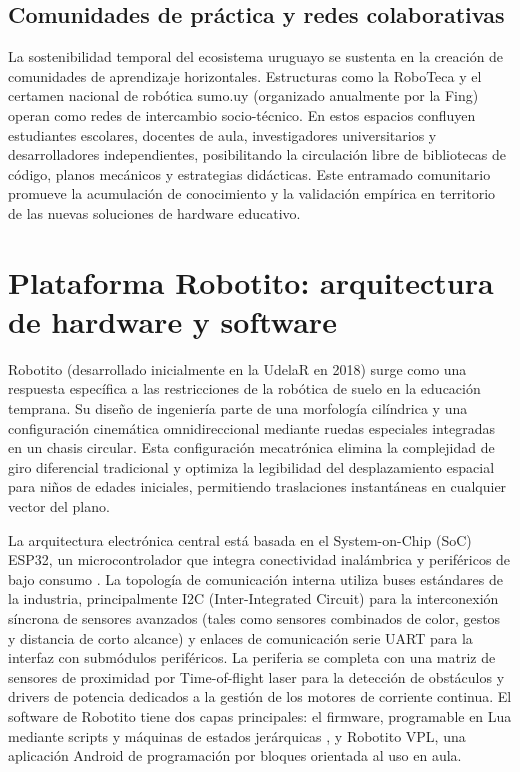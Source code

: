\documentclass{prgrado}
\begin{document}
\subsection{Comunidades de práctica y redes colaborativas}

La sostenibilidad temporal del ecosistema uruguayo se sustenta en la creación de comunidades de aprendizaje horizontales. Estructuras como la RoboTeca y el certamen nacional de robótica sumo.uy (organizado anualmente por la Fing) operan como redes de intercambio socio-técnico. En estos espacios confluyen estudiantes escolares, docentes de aula, investigadores universitarios y desarrolladores independientes, posibilitando la circulación libre de bibliotecas de código, planos mecánicos y estrategias didácticas. Este entramado comunitario promueve la acumulación de conocimiento y la validación empírica en territorio de las nuevas soluciones de hardware educativo.

\section{Plataforma Robotito: arquitectura de hardware y software}

Robotito (desarrollado inicialmente en la UdelaR en 2018) surge como una respuesta específica a las restricciones de la robótica de suelo en la educación temprana. Su diseño de ingeniería parte de una morfología cilíndrica y una configuración cinemática omnidireccional mediante ruedas especiales integradas en un chasis circular. Esta configuración mecatrónica elimina la complejidad de giro diferencial tradicional y optimiza la legibilidad del desplazamiento espacial para niños de edades iniciales, permitiendo traslaciones instantáneas en cualquier vector del plano.

La arquitectura electrónica central está basada en el System-on-Chip (SoC) ESP32, un microcontrolador que integra conectividad inalámbrica y periféricos de bajo consumo \cite{espressif2025esp32datasheet}.  La topología de comunicación interna utiliza buses estándares de la industria, principalmente I2C (Inter-Integrated Circuit) para la interconexión síncrona de sensores avanzados (tales como sensores combinados de color, gestos y distancia de corto alcance) y enlaces de comunicación serie UART para la interfaz con submódulos periféricos. La periferia se completa con una matriz de sensores de proximidad por Time-of-flight laser para la detección de obstáculos y drivers de potencia dedicados a la gestión de los motores de corriente continua. El software de Robotito tiene dos capas principales: el firmware, programable en Lua mediante scripts y máquinas de estados jerárquicas \cite{abeldano2024robotito}, y Robotito VPL, una aplicación Android de programación por bloques orientada al uso en aula.
\end{document}
